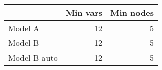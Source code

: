 
\begin{tabular}{l|r|r}
\hline
  & Min vars & Min nodes\\
\hline
Model A & 12 & 5\\
\hline
Model B & 12 & 5\\
\hline
Model B auto & 12 & 5\\
\hline
\end{tabular}